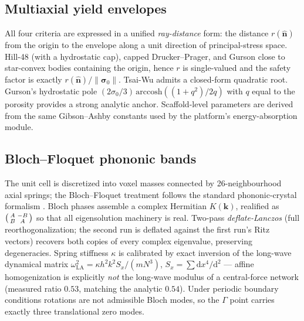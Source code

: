 \documentclass[5p,times,authoryear]{elsarticle}
\begin{document}
\subsection{Multiaxial yield envelopes}
All four criteria are expressed in a unified \emph{ray-distance} form: the distance $r(\hat{\mathbf{n}})$
from the origin to the envelope along a unit direction of principal-stress space. Hill-48
\cite{hill1948theory} (with a
hydrostatic cap), capped Drucker--Prager, and Gurson close to star-convex bodies containing the
origin, hence $r$ is single-valued and the safety factor is exactly $r(\hat{\mathbf{n}})/\|\boldsymbol{\sigma}_0\|$.
Tsai-Wu admits a closed-form quadratic root. Gurson's hydrostatic pole
\cite{gurson1977continuum}
$(2\sigma_0/3)\,\mathrm{arccosh}((1+q^2)/2q)$ with $q$ equal to the porosity provides a strong
analytic anchor. Scaffold-level parameters are derived from the same Gibson--Ashby constants
\cite{gibson1997cellular} used
by the platform's energy-absorption module.

\subsection{Bloch--Floquet phononic bands}
The unit cell is discretized into voxel masses connected by 26-neighbourhood axial springs;
the Bloch--Floquet treatment follows the standard phononic-crystal formalism
\cite{hussein2014review}.
Bloch phases assemble a complex Hermitian $K(\mathbf{k})$, realified as
$\begin{psmallmatrix}A&-B\\B&A\end{psmallmatrix}$ so that all eigensolution machinery is real.
Two-pass \emph{deflate-Lanczos} (full reorthogonalization; the second run is deflated against the
first run's Ritz vectors) recovers both copies of every complex eigenvalue, preserving degeneracies.
Spring stiffness $\kappa$ is calibrated by exact inversion of the long-wave dynamical matrix
$\omega^2_{\mathrm{LA}}=\kappa h^2 k^2 S_x/(mN^3)$, $S_x=\sum \mathrm{d}x^4/\mathrm{d}^2$ --- affine
homogenization is explicitly \emph{not} the long-wave modulus of a central-force network (measured
ratio $0.53$, matching the analytic $0.54$). Under periodic boundary conditions rotations are not
admissible Bloch modes, so the $\Gamma$ point carries exactly three translational zero modes.
\end{document}
